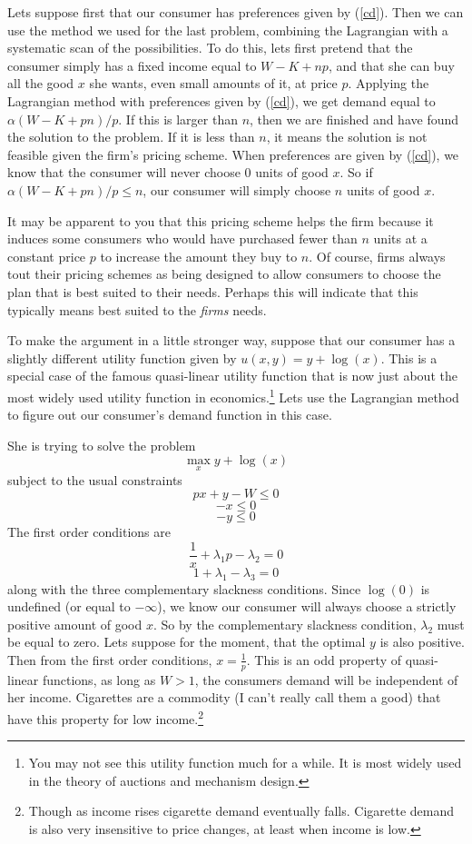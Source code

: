\documentclass[12pt]{article}
\newcommand{\tmem}[1]{{\em #1\/}}
\begin{document}
Lets suppose first that our consumer has preferences given by (\ref{cd}). Then
we can use the method we used for the last problem, combining the Lagrangian
with a systematic scan of the possibilities. To do this, lets first pretend
that the consumer simply has a fixed income equal to $W - K + n p$, and that
she can buy all the good $x$ she wants, even small amounts of it, at price
$p$. Applying the Lagrangian method with preferences given by (\ref{cd}), we
get demand equal to $\alpha ( W - K + p n ) / p$. If this is larger than $n$,
then we are finished and have found the solution to the problem. If it is less
than $n$, it means the solution is not feasible given the firm's pricing
scheme. When preferences are given by (\ref{cd}), we know that the consumer
will never choose $0$ units of good $x$. So if $\alpha ( W - K + p n ) / p
\leqslant n$, our consumer will simply choose $n$ units of good $x$.

It may be apparent to you that this pricing scheme helps the firm because it
induces some consumers who would have purchased fewer than $n$ units at a
constant price $p$ to increase the amount they buy to $n$. Of course, firms
always tout their pricing schemes as being designed to allow consumers to
choose the plan that is best suited to their needs. Perhaps this will indicate
that this typically means best suited to the {\tmem{firms}} needs.

To make the argument in a little stronger way, suppose that our consumer has a
slightly different utility function given by $u ( x, y ) = y + \log ( x )$.
This is a special case of the famous quasi-linear utility function that is now
just about the most widely used utility function in economics.{\footnote{You
may not see this utility function much for a while. It is most widely used in
the theory of auctions and mechanism design.}} Lets use the Lagrangian method
to figure out our consumer's demand function in this case.

She is trying to solve the problem
\[ \max_x y + \log ( x ) \]
subject to the usual constraints
\[ p x + y - W \leqslant 0 \]
\[ - x \leqslant 0 \]
\[ - y \leqslant 0 \]
The first order conditions are
\[ \frac{1}{x} + \lambda_1 p - \lambda_2 = 0 \]
\[ 1 + \lambda_1 - \lambda_3 = 0 \]
along with the three complementary slackness conditions. Since $\log ( 0 )$ is
undefined (or equal to $- \infty$), we know our consumer will always choose a
strictly positive amount of good $x$. So by the complementary slackness
condition, $\lambda_2$ must be equal to zero. Lets suppose for the moment,
that the optimal $y$ is also positive. Then from the first order conditions,
$x = \frac{1}{p}$. This is an odd property of quasi-linear functions, as long
as $W > 1$, the consumers demand will be independent of her income. Cigarettes
are a commodity (I can't really call them a good) that have this property for
low income.{\footnote{Though as income rises cigarette demand eventually
falls. Cigarette demand is also very insensitive to price changes, at least
when income is low.}}
\end{document}

